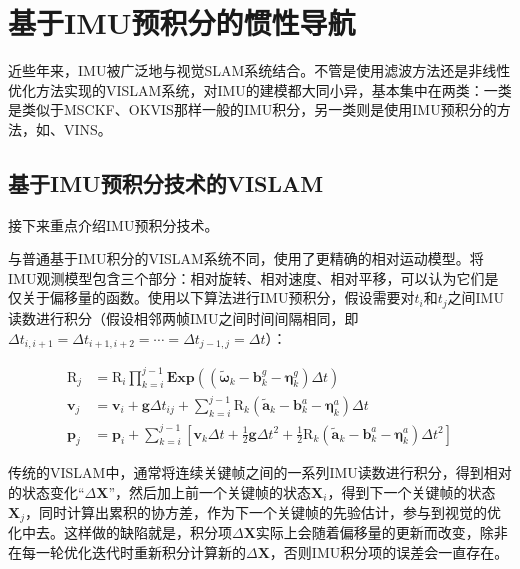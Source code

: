 \chapter{基于IMU预积分的惯性导航}\label{ch:vislam}

近些年来，IMU被广泛地与视觉SLAM系统结合。不管是使用滤波方法还是非线性优化方法实现的VISLAM系统，对IMU的建模都大同小异，基本集中在两类：一类是类似于MSCKF\citep{mourikis2007multi}、OKVIS\citep{leutenegger2015keyframe}那样一般的IMU积分，另一类则是使用IMU预积分的方法，如\citep{forster2017manifold}、VINS\citep{li2017monocular}。

\section{基于IMU预积分技术的VISLAM}

接下来重点介绍IMU预积分技术\citep{forster2017manifold}。

与普通基于IMU积分的VISLAM系统不同，\citeauthor{forster2017manifold}使用了更精确的相对运动模型。将IMU观测模型包含三个部分：相对旋转、相对速度、相对平移，可以认为它们是仅关于偏移量的函数。使用以下算法进行IMU预积分，假设需要对$t_i$和$t_j$之间IMU读数进行积分（假设相邻两帧IMU之间时间间隔相同，即$\Delta t_{i,i+1} = \Delta t_{i+1,i+2} = \cdots = \Delta t_{j-1,j} = \Delta t$）：

\begin{equation}
\begin{aligned}
\mathrm{R}_j &= \mathrm{R}_i \prod_{k=i}^{j-1}
                \bm{Exp}\left(
                    (\tilde{\bm\omega}_k - \mathbf{b}_k^g - \bm{\eta}_k^g) \Delta t
                \right) \\
\mathbf{v}_j &= \mathbf{v}_i + \mathbf{g} \Delta t_{ij} + \sum_{k=i}^{j-1}
                \mathrm{R}_k (\tilde{\mathbf a}_k - \mathbf{b}_k^a - \bm\eta_k^a) \Delta t \\
\mathbf{p}_j &= \mathbf{p}_i + \sum_{k=i}^{j-1}
                \left[
                    \mathbf{v}_k \Delta t +
                    \frac{1}{2}\mathbf{g}\Delta t^2 +
                    \frac{1}{2}\mathrm{R}_k
                    (\tilde{\mathbf a}_k - \mathbf{b}_k^a - \bm\eta_k^a) \Delta t^2
                \right]
    \end{aligned}
\end{equation}

传统的VISLAM中，通常将连续关键帧之间的一系列IMU读数进行积分，得到相对的状态变化“$\Delta\mathbf X$”，然后加上前一个关键帧的状态$\mathbf{X}_i$，得到下一个关键帧的状态$\mathbf{X}_j$，同时计算出累积的协方差，作为下一个关键帧的先验估计，参与到视觉的优化中去。这样做的缺陷就是，积分项$\Delta\mathbf X$实际上会随着偏移量的更新而改变，除非在每一轮优化迭代时重新积分计算新的$\Delta\mathbf X$，否则IMU积分项的误差会一直存在。

